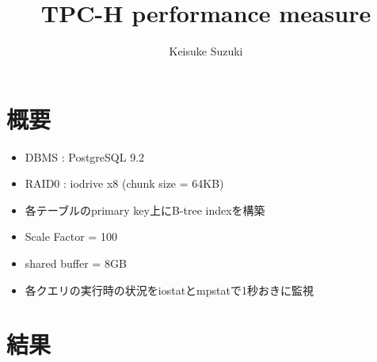 \documentclass[11pt,a4paper]{jsarticle}
\title{TPC-H performance measure}
\author{Keisuke Suzuki}
\begin{document}
\maketitle
\section{概要}
\begin{itemize}
 \item DBMS : PostgreSQL 9.2
 \item RAID0 : iodrive x8 (chunk size = 64KB)
 \item 各テーブルのprimary key上にB-tree indexを構築
 \item Scale Factor = 100
 \item shared buffer = 8GB
 \item 各クエリの実行時の状況をiostatとmpstatで1秒おきに監視
\end{itemize}

\section{結果}
\end{document}
